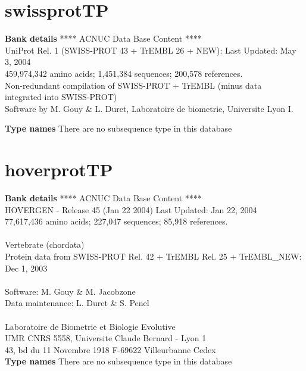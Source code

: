 \documentclass{article}
\begin{document}
\begin{Schunk}
\section{ swissprotTP }
\textbf{Bank details}
               ****     ACNUC Data Base Content      ****                       \\
  UniProt Rel. 1 (SWISS-PROT 43 + TrEMBL 26 + NEW): Last Updated: May  3, 2004\\
          459,974,342 amino acids; 1,451,384 sequences; 200,578 references.\\
          Non-redundant compilation of SWISS-PROT + TrEMBL (minus  data  \\
                     integrated  into  SWISS-PROT)\\
Software by M. Gouy \& L. Duret, Laboratoire de biometrie, Universite Lyon I.

\textbf{Type names}
There are no subsequence type in this database
\section{ hoverprotTP }
\textbf{Bank details}
               ****     ACNUC Data Base Content      ****                       \\
         HOVERGEN - Release 45 (Jan 22 2004) Last Updated: Jan 22, 2004\\
          77,617,436 amino acids; 227,047 sequences; 85,918 references.\\
\\
                       Vertebrate (chordata)	  \\
Protein data from SWISS-PROT Rel. 42  + TrEMBL Rel. 25 + TrEMBL\_NEW: Dec 1, 2003\\
\\
Software: M. Gouy \& M. Jacobzone\\
Data maintenance: L. Duret \& S. Penel\\
\\
Laboratoire de Biometrie et Biologie Evolutive\\
UMR CNRS 5558, Universite Claude Bernard - Lyon 1 \\
43, bd du 11 Novembre 1918 F-69622 Villeurbanne Cedex\\


\textbf{Type names}
There are no subsequence type in this database

\end{Schunk}
\end{document}
